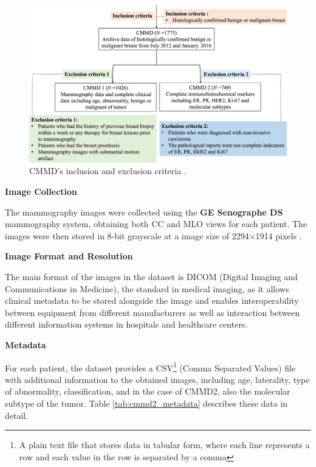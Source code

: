 \documentclass[a4paper,10pt]{book}
\begin{document}
\begin{figure}[h]
	\centering
	\includegraphics[width=0.8\linewidth]{reports//assets/cmmd_criteria.png}
	\caption{CMMD's inclusion and exclusion criteria \cite{cai_online_2023}.}
	\label{fig:cmmd_criteria}
\end{figure}

\textbf{Image Collection}

The mammography images were collected using the \textbf{GE Senographe DS} mammography system, obtaining both CC and MLO views for each patient. The images were then stored in 8-bit grayscale at a image size of 2294×1914 pixels \cite{cai_online_2023}.

\textbf{Image Format and Resolution}

The main format of the images in the dataset is DICOM (Digital Imaging and Communications in Medicine), the standard in medical imaging, as it allows clinical metadata to be stored alongside the image and enables interoperability between equipment from different manufacturers as well as interaction between different information systems in hospitals and healthcare centers.

\newpage
\textbf{Metadata}

For each patient, the dataset provides a CSV\footnote{A plain text file that stores data in tabular form, where each line represents a row and each value in the row is separated by a comma} (Comma Separated Values) file with additional information to the obtained images, including age, laterality, type of abnormality, classification, and in the case of CMMD2, also the molecular subtype of the tumor. Table \ref{tab:cmmd2_metadata} describes these data in detail.
\end{document}
